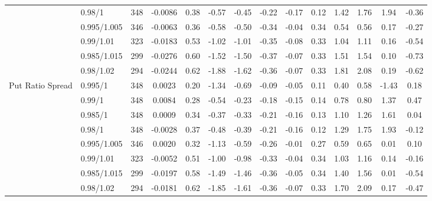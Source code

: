 \begin{tabular}{llcccccccccccc}
 & 0.98/1 & 348 & -0.0086 & 0.38 & -0.57 & -0.45 & -0.22 & -0.17 & 0.12 & 1.42 & 1.76 & 1.94 & -0.36 \\
 & 0.995/1.005 & 346 & -0.0063 & 0.36 & -0.58 & -0.50 & -0.34 & -0.04 & 0.34 & 0.54 & 0.56 & 0.17 & -0.27 \\
 & 0.99/1.01 & 323 & -0.0183 & 0.53 & -1.02 & -1.01 & -0.35 & -0.08 & 0.33 & 1.04 & 1.11 & 0.16 & -0.54 \\
 & 0.985/1.015 & 299 & -0.0276 & 0.60 & -1.52 & -1.50 & -0.37 & -0.07 & 0.33 & 1.51 & 1.54 & 0.10 & -0.73 \\
 & 0.98/1.02 & 294 & -0.0244 & 0.62 & -1.88 & -1.62 & -0.36 & -0.07 & 0.33 & 1.81 & 2.08 & 0.19 & -0.62 \\
Put Ratio Spread & 0.995/1 & 348 & 0.0023 & 0.20 & -1.34 & -0.69 & -0.09 & -0.05 & 0.11 & 0.40 & 0.58 & -1.43 & 0.18 \\
 & 0.99/1 & 348 & 0.0084 & 0.28 & -0.54 & -0.23 & -0.18 & -0.15 & 0.14 & 0.78 & 0.80 & 1.37 & 0.47 \\
 & 0.985/1 & 348 & 0.0009 & 0.34 & -0.37 & -0.33 & -0.21 & -0.16 & 0.13 & 1.10 & 1.26 & 1.61 & 0.04 \\
 & 0.98/1 & 348 & -0.0028 & 0.37 & -0.48 & -0.39 & -0.21 & -0.16 & 0.12 & 1.29 & 1.75 & 1.93 & -0.12 \\
 & 0.995/1.005 & 346 & 0.0020 & 0.32 & -1.13 & -0.59 & -0.26 & -0.01 & 0.27 & 0.59 & 0.65 & 0.01 & 0.10 \\
 & 0.99/1.01 & 323 & -0.0052 & 0.51 & -1.00 & -0.98 & -0.33 & -0.04 & 0.34 & 1.03 & 1.16 & 0.14 & -0.16 \\
 & 0.985/1.015 & 299 & -0.0197 & 0.58 & -1.49 & -1.46 & -0.36 & -0.05 & 0.34 & 1.40 & 1.56 & 0.01 & -0.54 \\
 & 0.98/1.02 & 294 & -0.0181 & 0.62 & -1.85 & -1.61 & -0.36 & -0.07 & 0.33 & 1.70 & 2.09 & 0.17 & -0.47 \\
\bottomrule
\end{tabular}
